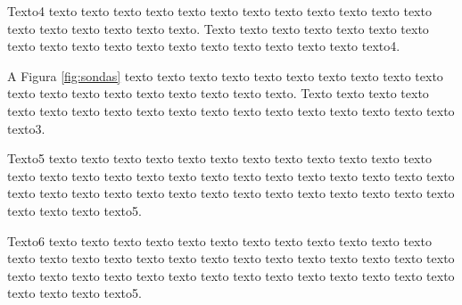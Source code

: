     Texto4 texto texto texto texto texto texto texto texto texto texto texto texto texto texto texto texto texto texto. Texto texto texto texto texto texto texto texto texto texto texto texto texto texto texto texto texto texto texto4.

    A Figura \ref{fig:sondas} texto texto texto texto texto texto texto texto texto texto texto texto texto texto texto texto texto texto texto. Texto texto texto texto texto texto texto texto texto texto texto texto texto texto texto texto texto texto texto3.

	\begin{figure}[h!]
		\centering
		\captionsetup{width=14cm}%
	\end{figure}

    Texto5 texto texto texto texto texto texto texto texto texto texto texto texto texto texto texto texto texto texto texto texto texto texto texto texto texto texto texto texto texto texto texto texto texto texto texto texto texto texto texto texto texto texto texto texto5.

    Texto6 texto texto texto texto texto texto texto texto texto texto texto texto texto texto texto texto texto texto texto texto texto texto texto texto texto texto texto texto texto texto texto texto texto texto texto texto texto texto texto texto texto texto texto texto5.

